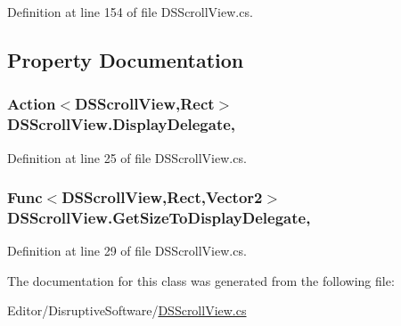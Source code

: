 Definition at line 154 of file D\+S\+Scroll\+View.\+cs.



\subsection{Property Documentation}
\hypertarget{class_d_s_scroll_view_a8ab2159844134c054149b399d98adc59}{
\subsubsection[{Display\+Delegate}]{\setlength{\rightskip}{0pt plus 5cm}Action$<${\bf D\+S\+Scroll\+View},Rect$>$ D\+S\+Scroll\+View.\+Display\+Delegate\hspace{0.3cm}{\ttfamily [get]}, {\ttfamily [set]}}}\label{class_d_s_scroll_view_a8ab2159844134c054149b399d98adc59}


Definition at line 25 of file D\+S\+Scroll\+View.\+cs.

\hypertarget{class_d_s_scroll_view_ad373079c51845a6cf4fc9d0bc4db6abe}{
\subsubsection[{Get\+Size\+To\+Display\+Delegate}]{\setlength{\rightskip}{0pt plus 5cm}Func$<${\bf D\+S\+Scroll\+View},Rect,Vector2$>$ D\+S\+Scroll\+View.\+Get\+Size\+To\+Display\+Delegate\hspace{0.3cm}{\ttfamily [get]}, {\ttfamily [set]}}}\label{class_d_s_scroll_view_ad373079c51845a6cf4fc9d0bc4db6abe}


Definition at line 29 of file D\+S\+Scroll\+View.\+cs.



The documentation for this class was generated from the following file\+:\begin{DoxyCompactItemize}
\item 
Editor/\+Disruptive\+Software/\hyperlink{_d_s_scroll_view_8cs}{D\+S\+Scroll\+View.\+cs}\end{DoxyCompactItemize}
